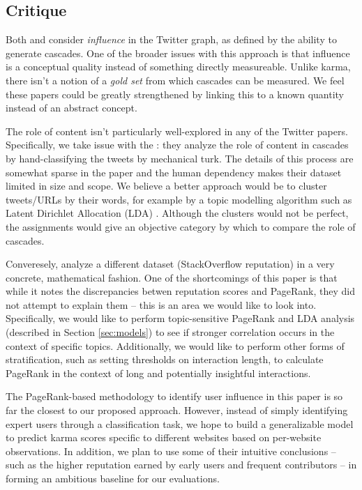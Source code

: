 \documentclass[10pt]{article}
\begin{document}
\subsection{Critique}
Both \citet{bakshy2011everyone} and \citet{cha2010measuring} consider
\textit{influence} in the Twitter graph, as defined by the ability to generate
cascades. One of the broader issues with this approach is that influence
is a conceptual quality instead of something directly measureable. Unlike karma,
there isn't a notion of a \textit{gold set} from which cascades can be measured.
We feel these papers could be greatly strengthened by linking this to a known
quantity instead of an abstract concept.

The role of content isn't particularly well-explored in any of the Twitter papers.
Specifically, we take issue with the \citet{bakshy2011everyone}: they analyze
the role of content in cascades by hand-classifying the tweets by mechanical turk.
The details of this process are somewhat sparse in the paper and the human
dependency makes their dataset limited in size and scope. We believe a better
approach would be to cluster tweets/URLs by their words, for example by 
a topic modelling algorithm such as Latent Dirichlet Allocation (LDA)
\citep{blei2003latent}. Although the clusters would not be perfect, the assignments
would give an objective category by which to compare the role of cascades.

Converesely, \citet{movshovitzanalysis} analyze a different dataset 
(StackOverflow reputation) in a very concrete, mathematical fashion.
One of the shortcomings of this paper is that while it notes the discrepancies
betwen reputation scores and PageRank, they did not attempt to explain them --
this is an area we would like to look into. Specifically, we would like to
perform topic-sensitive PageRank and LDA analysis (described in Section
\ref{sec:models}) to see if stronger correlation occurs in the context of
specific topics.  Additionally, we would like to perform other forms of
stratification, such as setting thresholds on interaction length, to calculate
PageRank in the context of long and potentially insightful interactions.

The PageRank-based methodology to identify user influence in this paper is so
far the closest to our proposed approach. However, instead of simply identifying
expert users through a classification task, we hope to build a generalizable
model to predict karma scores specific to different websites based on
per-website observations.  In addition, we plan to use some of their intuitive
conclusions -- such as the higher reputation earned by early users and frequent
contributors -- in forming an ambitious baseline for our evaluations.
\end{document}
